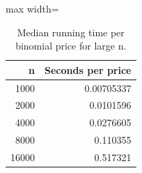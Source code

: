 \begin{table}
\centering
\small
\caption{Median running time per binomial price for large n.}
\label{tab:e10_timing_large_n}
\begin{adjustbox}{max width=\textwidth}
\begin{tabular}{rr}
\toprule
n & Seconds per price \\
\midrule
1000 & 0.00705337 \\
2000 & 0.0101596 \\
4000 & 0.0276605 \\
8000 & 0.110355 \\
16000 & 0.517321 \\
\bottomrule
\end{tabular}
\end{adjustbox}
\end{table}
